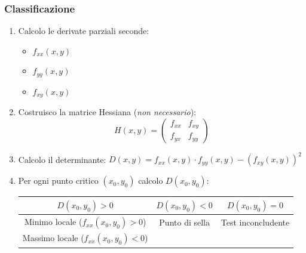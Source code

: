 \documentclass[10pt, a4paper]{article}
\begin{document}
        \subsubsection{Classificazione}
            \begin{enumerate}
                \item Calcolo le derivate parziali seconde: \begin{itemize}
                    \item $f_{xx}(x,y)$
                    \item $f_{yy}(x,y)$
                    \item $f_{xy}(x,y)$
                \end{itemize}
                \item Costruisco la matrice Hessiana (\textit{non necessario}): \begin{equation*}
                    H(x,y)=\begin{pmatrix}
                        f_{xx} & f_{xy} \\
                        f_{yx} & f_{yy}
                    \end{pmatrix}
                \end{equation*}
                \item Calcolo il determinante: $D(x,y)=f_{xx}(x,y)\cdot f_{yy}(x,y)-\left(f_{xy}(x,y)\right)^2$
                \item Per ogni punto critico $(x_0,y_0)$ calcolo $D(x_0,y_0)$:
                \\\begin{tabular}{| c | c | c |}
                    \hline
                    $D(x_0,y_0)>0$ & $D(x_0,y_0)<0$ & $D(x_0,y_0)=0$\\
                    \hline
                        Minimo locale ($f_{xx}(x_0,y_0)>0$) & Punto di sella & Test inconcludente \\
                        Massimo locale ($f_{xx}(x_0,y_0)<0$) & & \\
                    \hline
                \end{tabular}
            \end{enumerate}
\end{document}
